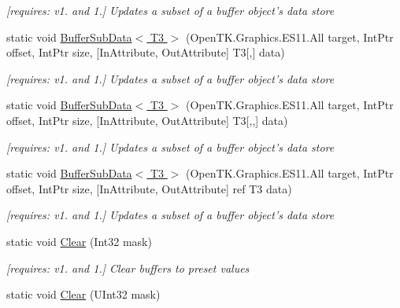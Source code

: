 \begin{DoxyCompactItemize}
\begin{DoxyCompactList}\small\item\em \mbox{[}requires\-: v1. and 1.\mbox{]} Updates a subset of a buffer object's data store \end{DoxyCompactList}\item 
static void \hyperlink{class_open_t_k_1_1_graphics_1_1_e_s11_1_1_g_l_ab83480f236e01b9c9234cc4385307cb6}{Buffer\-Sub\-Data$<$ T3 $>$} (Open\-T\-K.\-Graphics.\-E\-S11.\-All target, Int\-Ptr offset, Int\-Ptr size, \mbox{[}In\-Attribute, Out\-Attribute\mbox{]} T3\mbox{[},\mbox{]} data)
\begin{DoxyCompactList}\small\item\em \mbox{[}requires\-: v1. and 1.\mbox{]} Updates a subset of a buffer object's data store \end{DoxyCompactList}\item 
static void \hyperlink{class_open_t_k_1_1_graphics_1_1_e_s11_1_1_g_l_aae7185625b7615c97fd3adc981c39389}{Buffer\-Sub\-Data$<$ T3 $>$} (Open\-T\-K.\-Graphics.\-E\-S11.\-All target, Int\-Ptr offset, Int\-Ptr size, \mbox{[}In\-Attribute, Out\-Attribute\mbox{]} T3\mbox{[},,\mbox{]} data)
\begin{DoxyCompactList}\small\item\em \mbox{[}requires\-: v1. and 1.\mbox{]} Updates a subset of a buffer object's data store \end{DoxyCompactList}\item 
static void \hyperlink{class_open_t_k_1_1_graphics_1_1_e_s11_1_1_g_l_ad4e4d430bb583bc1e80a497f1d656c86}{Buffer\-Sub\-Data$<$ T3 $>$} (Open\-T\-K.\-Graphics.\-E\-S11.\-All target, Int\-Ptr offset, Int\-Ptr size, \mbox{[}In\-Attribute, Out\-Attribute\mbox{]} ref T3 data)
\begin{DoxyCompactList}\small\item\em \mbox{[}requires\-: v1. and 1.\mbox{]} Updates a subset of a buffer object's data store \end{DoxyCompactList}\item 
static void \hyperlink{class_open_t_k_1_1_graphics_1_1_e_s11_1_1_g_l_a6dc7ac8d7aa6d00cba4eb9462d16c5ea}{Clear} (Int32 mask)
\begin{DoxyCompactList}\small\item\em \mbox{[}requires\-: v1. and 1.\mbox{]} Clear buffers to preset values \end{DoxyCompactList}\item 
static void \hyperlink{class_open_t_k_1_1_graphics_1_1_e_s11_1_1_g_l_ae042bbf3c2f39de8f6b4b1e441d27f30}{Clear} (U\-Int32 mask)

\end{DoxyCompactItemize}
